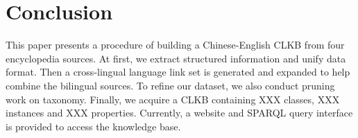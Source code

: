 \documentclass[runningheads,a4paper]{llncs}
\begin{document}

\section{Conclusion}
\label{sec:con}
This paper presents a procedure of building a Chinese-English CLKB from four encyclopedia sources. At first, we extract structured information and unify data format. Then a cross-lingual language link set is generated and expanded to help combine the bilingual sources. To refine our dataset, we also conduct pruning work on taxonomy. Finally, we acquire a CLKB containing XXX classes, XXX instances and XXX properties. Currently, a website and SPARQL query interface is provided to access the knowledge base.





\end{document}
